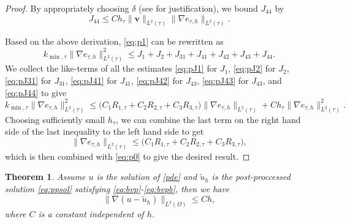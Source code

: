 \documentclass[times]{nlaauth}
\numberwithin{equation}{section}
\begin{document}
\begin{proof}
\noindent
By appropriately choosing $\delta$ (see \cite{tezduyar2000finite, tezduyar2003stabilization} for justification), we bound $J_{44}$ by
\begin{equation} \label{eq:pJ44}
J_{44} \leq Ch_\tau \| \boldsymbol{v} \|_{L^2(\tau)} \| \nabla e_{\tau, h} \|_{L^2{(\tau)}}.
\end{equation}

\noindent
Based on the above derivation, \eqref{eq:p1} can be rewritten as
\begin{equation*}
k_{\min, \tau} \| \nabla e_{\tau, h} \|^2_{L^2(\tau)} \leq J_1 + J_2 + J_{31} + J_{41} + J_{42} + J_{43} + J_{44}.
\end{equation*}
We collect the like-terms of all the estimates \eqref{eq:pJ1} for $J_1$, \eqref{eq:pJ2} for $J_2$, \eqref{eq:pJ31} for $J_{31}$, \eqref{eq:pJ41} for $J_{41}$, \eqref{eq:pJ42} for $J_{43}$, \eqref{eq:pJ43} for $J_{43}$, and \eqref{eq:pJ44} to give
\begin{equation*}
k_{\min, \tau} \| \nabla e_{\tau, h} \|^2_{L^2(\tau)} \leq \big( C_1 R_{1,\tau} + C_2 R_{2,\tau} + C_3R_{3,\tau} \big) \| \nabla e_{\tau, h} \|_{L^2(\tau)} + C h_\tau \| \nabla e_{\tau, h} \|^2_{L^2(\tau)}.
\end{equation*}
Choosing sufficiently small $h_\tau$, we can combine the last term on the right hand
side of the last inequality to the left hand side to get
\begin{equation*}
\| \nabla e_{\tau, h} \|_{L^2(\tau)} \leq \big( C_1 R_{1,\tau} + C_2 R_{2,\tau} + C_3R_{3,\tau} \big),
\end{equation*}
which is then combined with \eqref{eq:p0} to give the desired result. 
\end{proof}

\newtheorem{thm}{Theorem}[section]
\begin{thm} \label{thm:perr}
Assume $u$ is the solution of \eqref{pde} and $\widetilde u_h$ is the post-proccessed solution \eqref{eq:ppsol} satisfying \eqref{eq:bvp}-\eqref{eq:bvpb}, then we have
$$
\| \nabla ( u - \widetilde u_h) \|_{L^2(\Omega)} \leq Ch,
$$
where $C$ is a constant independent of $h$.
\end{thm}
\end{document}
